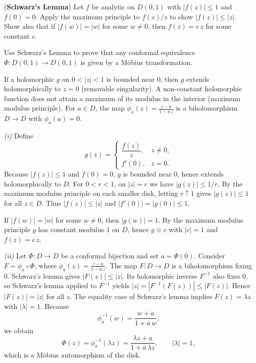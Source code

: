 \begin{problem}[CP-IV-0080]
\label{prob:cp-iv-0080}
\par\noindent\textbullet\quad (\textbf{Schwarz's Lemma}) Let $f$ be analytic on $D(0,1)$ with $|f(z)|\le 1$ and $f(0)=0$.
	Apply the maximum principle to $f(z)/z$ to show $|f(z)|\le |z|$. Show also that if $|f(w)|=|w|$ for some $w\neq 0$, then $f(z)=c\,z$ for some constant $c$.

	\par\noindent\textbullet\quad Use Schwarz's Lemma to prove that any conformal equivalence $\Phi:D(0,1)\to D(0,1)$ is given by a Möbius transformation.

If a holomorphic $g$ on $0<|z|<1$ is bounded near $0$, then $g$ extends holomorphically to $z=0$ (removable singularity).
A non-constant holomorphic function does not attain a maximum of its modulus in the interior (maximum modulus principle).
For $a\in D$, the map $\displaystyle \phi_a(z)=\frac{z-a}{1-\overline a\,z}$ is a biholomorphism $D\to D$ with $\phi_a(a)=0$.
\end{problem}



\begin{solution}
\emph{(i)} Define
\[
g(z)=\begin{cases}
	\dfrac{f(z)}{z},& z\neq 0,\\[4pt]
	f'(0),& z=0.
\end{cases}
\]
Because $|f(z)|\le 1$ and $f(0)=0$, $g$ is bounded near $0$, hence extends holomorphically to $D$.
For $0<r<1$, on $|z|=r$ we have $|g(z)|\le 1/r$. By the maximum modulus principle on each smaller disk, letting $r\uparrow 1$ gives $|g(z)|\le 1$ for all $z\in D$.
Thus $|f(z)|\le |z|$ and $|f'(0)|=|g(0)|\le 1$.

If $|f(w)|=|w|$ for some $w\ne 0$, then $|g(w)|=1$. By the maximum modulus principle $g$ has constant modulus $1$ on $D$, hence $g\equiv c$ with $|c|=1$ and $f(z)=c\,z$.

\medskip
\emph{(ii)} Let $\Phi:D\to D$ be a conformal bijection and set $a=\Phi(0)$. Consider $F=\phi_a\circ \Phi$, where $\displaystyle \phi_a(z)=\frac{z-a}{1-\overline a\,z}$.
The map $F:D\to D$ is a biholomorphism fixing $0$.
Schwarz's lemma gives $|F(z)|\le|z|$. Its holomorphic inverse
$F^{-1}$ also fixes $0$, so Schwarz's lemma applied to $F^{-1}$ yields
$|z|=|F^{-1}(F(z))|\le|F(z)|$. Hence $|F(z)|=|z|$ for all $z$.
The equality case of Schwarz's lemma implies $F(z)=\lambda z$
with $|\lambda|=1$. Because
\[
\phi_a^{-1}(w)=\frac{w+a}{1+\overline a\,w},
\]
we obtain
\[
\Phi(z)=\phi_a^{-1}(\lambda z)
=\frac{\lambda z+a}{1+\overline a\,\lambda z},\qquad |\lambda|=1,
\]
which is a M\"obius automorphism of the disk.
\end{solution}

